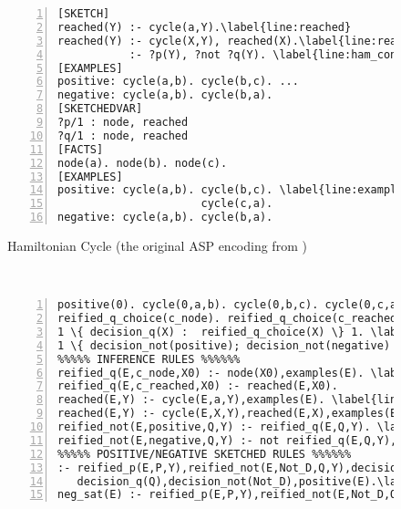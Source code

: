 \newcommand{\rulesep}{\unskip\ \vrule\ }
\newcommand{\hrulesep}{\unskip\ \hrule\ }

\begin{figure*}[htb]
\begin{subfigure}[t]{0.315\textwidth}
  \renewcommand{\figurename}{Listing}
  \vspace{3pt}
  \begin{Verbatim}[fontsize=\scriptsize,numbers=left,xleftmargin=0mm,commandchars=\\\{\}]
[SKETCH]
reached(Y) :- cycle(a,Y).\label{line:reached}
reached(Y) :- cycle(X,Y), reached(X).\label{line:reached2}
           :- ?p(Y), ?not ?q(Y). \label{line:ham_constraint}
[EXAMPLES]
positive: cycle(a,b). cycle(b,c). ...
negative: cycle(a,b). cycle(b,a).
[SKETCHEDVAR]
?p/1 : node, reached
?q/1 : node, reached
[FACTS]
node(a). node(b). node(c).
[EXAMPLES]
positive: cycle(a,b). cycle(b,c). \label{line:example}
                      cycle(c,a).
negative: cycle(a,b). cycle(b,a).
\end{Verbatim}
\caption{Hamiltonian Cycle (the original ASP encoding from \protect\parencite{ASPbook})} \label{lst:ham}
\end{subfigure}
\rulesep
\begin{subfigure}[t]{0.66\textwidth}
  \vspace{3pt}
  \renewcommand{\figurename}{Sketch}
  \begin{Verbatim}[fontsize=\scriptsize,numbers=left,xleftmargin=6mm,commandchars=\\\{\}]
%%%%% EXAMPLES AND DECISIONS %%%%%%
positive(0). cycle(0,a,b). cycle(0,b,c). cycle(0,c,a). \label{line:example_rewritten}
reified_q_choice(c_node). reified_q_choice(c_reached).
1 \{ decision_q(X) :  reified_q_choice(X) \} 1. \label{line:decision1}
1 \{ decision_not(positive); decision_not(negative) \} 1.\label{line:decision2}
%%%%% INFERENCE RULES %%%%%%
reified_q(E,c_node,X0) :- node(X0),examples(E). \label{line:reified_q}
reified_q(E,c_reached,X0) :- reached(E,X0).
reached(E,Y) :- cycle(E,a,Y),examples(E). \label{line:reach_rewritten}
reached(E,Y) :- cycle(E,X,Y),reached(E,X),examples(E).
reified_not(E,positive,Q,Y) :- reified_q(E,Q,Y). \label{line:reified_not1}
reified_not(E,negative,Q,Y) :- not reified_q(E,Q,Y),dom1(Y),...\label{line:reified_not2}
%%%%% POSITIVE/NEGATIVE SKETCHED RULES %%%%%%
:- reified_p(E,P,Y),reified_not(E,Not_D,Q,Y),decision_p(P), \label{line:positive_rewritten1}
   decision_q(Q),decision_not(Not_D),positive(E).\label{line:positive_rewritten2}
neg_sat(E) :- reified_p(E,P,Y),reified_not(E,Not_D,Q,Y), \label{line:negative_rewritten1}

\end{Verbatim}
\end{subfigure}
\end{figure*}
